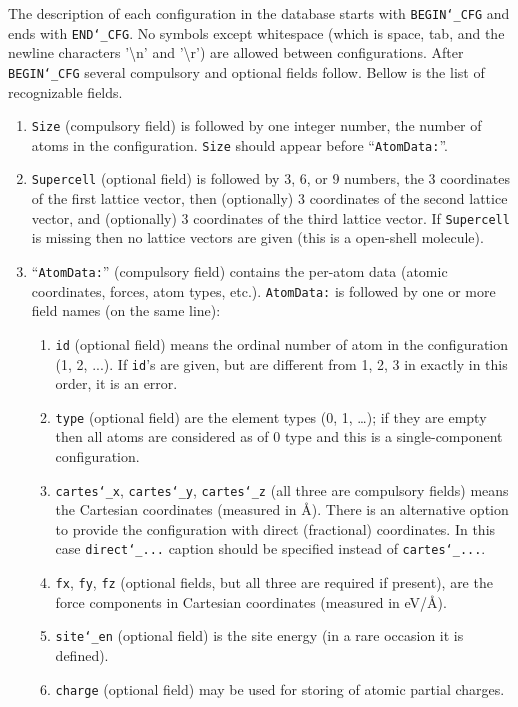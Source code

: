 \documentclass[12pt]{article}
\renewcommand{\_}{\char`_}
\begin{document}
The description of each configuration in the database starts with \texttt{BEGIN\_CFG} and ends with \texttt{END\_CFG}. No symbols except whitespace (which is space, tab, and the newline characters '\textbackslash n' and '\textbackslash r') are allowed between configurations.
After \texttt{BEGIN\_CFG} several compulsory and optional fields follow. Bellow is the list of recognizable fields. 
\begin{enumerate}
	\item \texttt{Size} (compulsory field) is followed by one integer number, the number of atoms in the configuration.
	\texttt{Size} should appear before ``\texttt{AtomData:}''.
	
	\item \texttt{Supercell} (optional field) is followed by 3, 6, or 9 numbers, the 3 coordinates of the first lattice vector, then (optionally) 3 coordinates of the second lattice vector, and (optionally) 3 coordinates of the third lattice vector. 
	If \texttt{Supercell} is missing then no lattice vectors are given (this is a open-shell molecule).
	
	\item ``\texttt{AtomData:}'' (compulsory field) contains the per-atom data (atomic coordinates, forces, atom types, etc.). 		\texttt{AtomData:} is followed by one or more field names (on the same line):
	\begin{enumerate}
		\item \texttt{id} (optional field) means the ordinal number of atom in the configuration (1, 2, ...). If \texttt{id}'s are given, but are different from 1, 2, 3 in exactly in this order, it is an error.
		\item \texttt{type} (optional field) are the element types (0, 1, \ldots); if they are empty then all atoms are considered as of $0$ type and this is a single-component configuration.
		\item \texttt{cartes\_x}, \texttt{cartes\_y}, \texttt{cartes\_z} (all three are compulsory fields) means the Cartesian coordinates (measured in \AA).
		There is an alternative option to provide the configuration with direct (fractional) coordinates. In this case \texttt{direct\_...} caption should be specified instead of \texttt{cartes\_...}.
		\item \texttt{fx}, \texttt{fy}, \texttt{fz} (optional fields, but all three are required if present), are the force components in Cartesian coordinates (measured in eV/\AA).
		\item \texttt{site\_en} (optional field) is the site energy (in a rare occasion it is defined). 
		\item \texttt{charge} (optional field) may be used for storing of atomic partial charges.
	\end{enumerate}


\end{enumerate}
\end{document}
